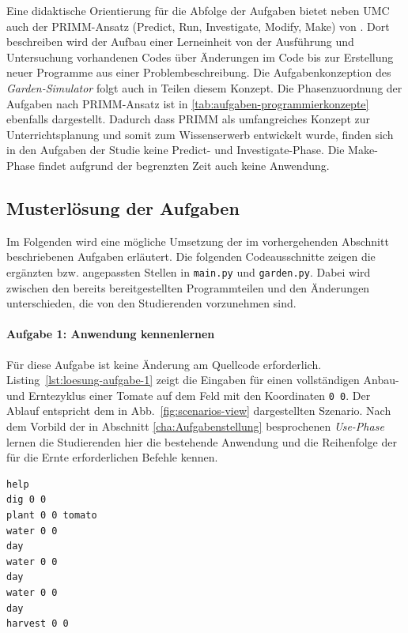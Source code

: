 Eine didaktische Orientierung für die Abfolge der Aufgaben bietet neben UMC auch der PRIMM-Ansatz (Predict, Run, Investigate, Modify, Make) von \textcite[S.~13-16]{sentance_teaching_2019}. Dort beschreiben wird der Aufbau einer Lerneinheit von der Ausführung und Untersuchung vorhandenen Codes über Änderungen im Code bis zur Erstellung neuer Programme aus einer Problembeschreibung. Die Aufgabenkonzeption des \textit{Garden-Simulator} folgt auch in Teilen diesem Konzept. Die Phasenzuordnung der Aufgaben nach PRIMM-Ansatz ist in \ref{tab:aufgaben-programmierkonzepte} ebenfalls dargestellt. Dadurch dass PRIMM als umfangreiches Konzept zur Unterrichtsplanung und somit zum Wissenserwerb entwickelt wurde, finden sich in den Aufgaben der Studie keine Predict- und Investigate-Phase. Die Make-Phase findet aufgrund der begrenzten Zeit auch keine Anwendung. 

\subsection{Musterlösung der Aufgaben}\label{cha:musterloesung}
Im Folgenden wird eine mögliche Umsetzung der im vorhergehenden Abschnitt beschriebenen Aufgaben erläutert. Die folgenden Codeausschnitte zeigen die ergänzten bzw. angepassten Stellen in \texttt{main.py} und \texttt{garden.\allowbreak py}. Dabei wird zwischen den bereits bereitgestellten Programmteilen und den Änderungen unterschieden, die von den Studierenden vorzunehmen sind.

\paragraph*{Aufgabe 1: Anwendung kennenlernen}
Für diese Aufgabe ist keine Änderung am Quellcode erforderlich. Listing~\ref{lst:loesung-aufgabe-1} zeigt die Eingaben für einen vollständigen Anbau- und Erntezyklus einer Tomate auf dem Feld mit den Koordinaten \texttt{0 0}. Der Ablauf entspricht dem in Abb.~\ref{fig:scenarios-view} dargestellten Szenario. Nach dem Vorbild der in Abschnitt \ref{cha:Aufgabenstellung} besprochenen \textit{Use-Phase} lernen die Studierenden hier die bestehende Anwendung und die Reihenfolge der für die Ernte erforderlichen Befehle kennen.

\begin{lstlisting}[style=mystyle,language={},caption={Befehlsfolge zur Bearbeitung von Aufgabe 1.},label={lst:loesung-aufgabe-1}]
help
dig 0 0
plant 0 0 tomato
water 0 0
day
water 0 0
day
water 0 0
day
harvest 0 0
\end{lstlisting}

